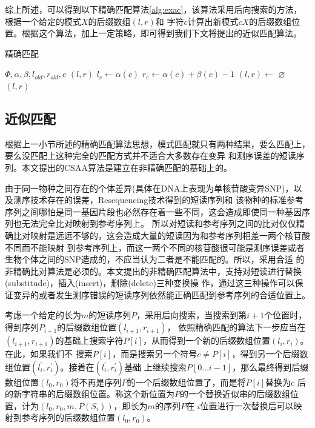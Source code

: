 \documentclass[UTF8,adobefonts]{ctexart}
\begin{document}
综上所述，可以得到以下精确匹配算法\ref{alg:exac}，该算法采用后向搜索的方法，根据一个给定的模式$X$的后缀数组$(l,r)$和
字符$c$计算出新模式$cX$的后缀数组位置。根据这个算法，加上一定策略，即可得到我们下文将提出的近似匹配算法。

\begin{algorithm}
    \caption{精确匹配}
    \label{alg:exac}
    \begin{algorithmic}[1]
        \Require $\Phi,\alpha,\beta,l_{old},r_{old},c$
        \Ensure $(l,r)$
        \State $l_c \gets \alpha(c)$
        \State $r_c \gets \alpha(c)+\beta(c)-1$
        \State $(l,r) \gets $
            \State \Return $\varnothing$
        \Else
            \State \Return $(l,r)$
        \EndIf
        \EndFunction
    \end{algorithmic}
\end{algorithm}

\subsection{近似匹配}

根据上一小节所述的精确匹配算法思想，模式匹配就只有两种结果，要么匹配上，要么没匹配上这种完全的匹配方式并不适合大多数存在变异
和测序误差的短读序列。本文提出的CSAA算法是建立在非精确匹配的基础上的。

由于同一物种之间存在的个体差异(具体在DNA上表现为单核苷酸变异SNP)，以及测序技术存在的误差，Resequencing技术得到的短读序列和
该物种的标准参考序列之间哪怕是同一基因片段也必然存在着一些不同，这会造成即使同一种基因序列也无法完全比对映射到参考序列上。
所以对短读和参考序列之间的比对仅仅精确比对映射是远远不够的，这会造成大量的短读因为和参考序列相差一两个核苷酸不同而不能映射
到参考序列上，而这一两个不同的核苷酸很可能是测序误差或者生物个体之间的SNP造成的，不应当认为二者是不能匹配的。所以，采用合适
的非精确比对算法是必须的。本文提出的非精确匹配算法中，支持对短读进行替换(substitude)，插入(insert)，删除(delete)三种变换操
作，通过这三种操作可以保证变异的或者发生测序错误的短读序列依然能正确匹配到参考序列的合适位置上。

考虑一个给定的长为$m$的短读序列$P$，采用后向搜索，当搜索到第$i+1$个位置时，得到序列$P_{i+1}$的后缀数组位置$(l_{i+1},r_{i+1})$，
依照精确匹配的算法下一步应当在$(l_{i+1},r_{i+1})$的基础上搜索字符$P[i]$，从而得到一个新的后缀数组位置$(l_i,r_i)$。在此，如果我们不
搜索$P[i]$，而是搜索另一个符号$c \neq P[i]$，得到另一个后缀数组位置$(l_{i}^{'},r_{i}^{'})$。接着在$(l_{i}^{'},r_{i}^{'})$基础
上继续搜索$P[0\ldots i-1]$，那么最终得到后缀数组位置$(l_0,r_0)$将不再是序列$P$的一个后缀数组位置了，而是将$P[i]$替换为$c$
后的新字符串的后缀数组位置。称这个新位置为$P$的一个替换近似串的后缀数组位置，计为$(l_0,r_0,m,P(S_i))$，即长为$m$的序列$P$在
$i$位置进行一次替换后可以映射到参考序列的后缀数组位置$(l_0,r_0)$。
\end{document}
